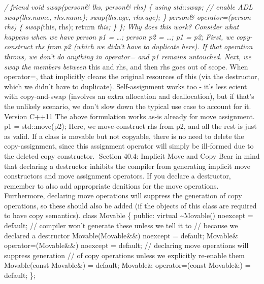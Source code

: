 \emph{/ friend void swap(person\& lhs, person\& rhs) \{ using std::swap;
// enable ADL swap(lhs.name, rhs.name); swap(lhs.age, rhs.age); \}
person\& operator=(person rhs) \{ swap(}this, rhs); return \emph{this;
\} \}; Why does this work? Consider what happens when we have person p1
= \ldots; person p2 = \ldots; p1 = p2; First, we copy-construct rhs from
p2 (which we didn't have to duplicate here). If that operation throws,
we don't do anything in operator= and p1 remains untouched. Next, we
swap the members between }this and rhs, and then rhs goes out of scope.
When operator=, that implicitly cleans the original resources of this
(via the destructor, which we didn't have to duplicate). Self-assignment
works too - it's less ecient with copy-and-swap (involves an extra
allocation and deallocation), but if that's the unlikely scenario, we
don't slow down the typical use case to account for it. Version C++11
The above formulation works as-is already for move assignment. p1 =
std::move(p2); Here, we move-construct rhs from p2, and all the rest is
just as valid. If a class is movable but not copyable, there is no need
to delete the copy-assignment, since this assignment operator will
simply be ill-formed due to the deleted copy constructor. Section 40.4:
Implicit Move and Copy Bear in mind that declaring a destructor inhibits
the compiler from generating implicit move constructors and move
assignment operators. If you declare a destructor, remember to also add
appropriate denitions for the move operations. Furthermore, declaring
move operations will suppress the generation of copy operations, so
these should also be added (if the objects of this class are required to
have copy semantics). class Movable \{ public: virtual
\textasciitilde Movable() noexcept = default; // compiler won't generate
these unless we tell it to // because we declared a destructor
Movable(Movable\&\&) noexcept = default; Movable\&
operator=(Movable\&\&) noexcept = default; // declaring move operations
will suppress generation // of copy operations unless we explicitly
re-enable them Movable(const Movable\&) = default; Movable\&
operator=(const Movable\&) = default; \};
